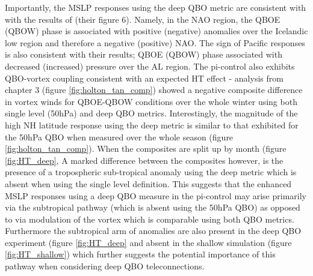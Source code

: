 Importantly, the MSLP responses using the deep QBO metric are consistent with with the results of \cite{andrewsObserved2019d} (their figure 6). Namely, in the NAO region, the QBOE (QBOW) phase is associated with positive (negative) anomalies over the Icelandic low region and therefore a negative (positive) NAO. The sign of Pacific responses is also consistent with their results; QBOE (QBOW) phase associated with decreased (increased) pressure over the AL region. The pi-control also exhibits QBO-vortex coupling consistent with an expected HT effect - analysis from chapter 3 (figure \ref{fig:holton_tan_comp}) showed a negative composite difference in vortex winds for QBOE-QBOW conditions over the whole winter using both single level (50hPa) and deep QBO metrics. Interestingly, the magnitude of the high NH latitude response using the deep metric is similar to that exhibited for the 50hPa QBO when measured over the whole season (figure \ref{fig:holton_tan_comp}). When the composites are split up by month (figure \ref{fig:HT_deep},  A marked difference between the composites however, is the presence of a tropospheric sub-tropical anomaly using the deep metric which is absent when using the single level definition. This suggests that the enhanced MSLP responses using a deep QBO measure in the pi-control may arise primarily via the subtropical pathway (which is absent using the 50hPa QBO) as opposed to via modulation of the vortex which is comparable using both QBO metrics. Furthermore the subtropical arm of anomalies are also present in the deep QBO experiment (figure \ref{fig:HT_deep} and absent in the shallow simulation (figure \ref{fig:HT_shallow}) which further suggests the potential importance of this pathway when considering deep QBO teleconnections.

